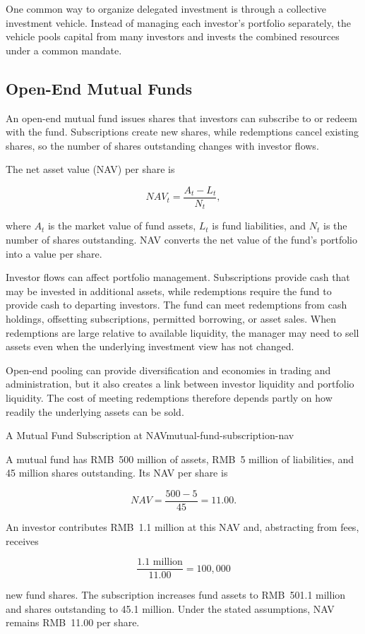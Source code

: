 One common way to organize delegated investment is through a collective investment vehicle. Instead of managing each investor's portfolio separately, the vehicle pools capital from many investors and invests the combined resources under a common mandate.

\subsection{Open-End Mutual Funds}

An open-end mutual fund issues shares that investors can subscribe to or redeem with the fund. Subscriptions create new shares, while redemptions cancel existing shares, so the number of shares outstanding changes with investor flows.

The net asset value (NAV) per share is

\begin{equation}
\textit{NAV}_t=
\frac{A_t-L_t}{N_t},
\label{eq:ch14-nav}
\end{equation}

where $A_t$ is the market value of fund assets, $L_t$ is fund liabilities, and $N_t$ is the number of shares outstanding. NAV converts the net value of the fund's portfolio into a value per share.

Investor flows can affect portfolio management. Subscriptions provide cash that may be invested in additional assets, while redemptions require the fund to provide cash to departing investors. The fund can meet redemptions from cash holdings, offsetting subscriptions, permitted borrowing, or asset sales. When redemptions are large relative to available liquidity, the manager may need to sell assets even when the underlying investment view has not changed.

Open-end pooling can provide diversification and economies in trading and administration, but it also creates a link between investor liquidity and portfolio liquidity. The cost of meeting redemptions therefore depends partly on how readily the underlying assets can be sold.

\begin{example}{A Mutual Fund Subscription at NAV}{mutual-fund-subscription-nav}

A mutual fund has RMB~500 million of assets, RMB~5 million of liabilities, and 45 million shares outstanding. Its NAV per share is

\[
\textit{NAV}=\frac{500-5}{45}=11.00.
\]

An investor contributes RMB~1.1 million at this NAV and, abstracting from fees, receives

\[
\frac{1.1\text{ million}}{11.00}=100{,}000
\]

new fund shares. The subscription increases fund assets to RMB~501.1 million and shares outstanding to 45.1 million. Under the stated assumptions, NAV remains RMB~11.00 per share.

\end{example}

